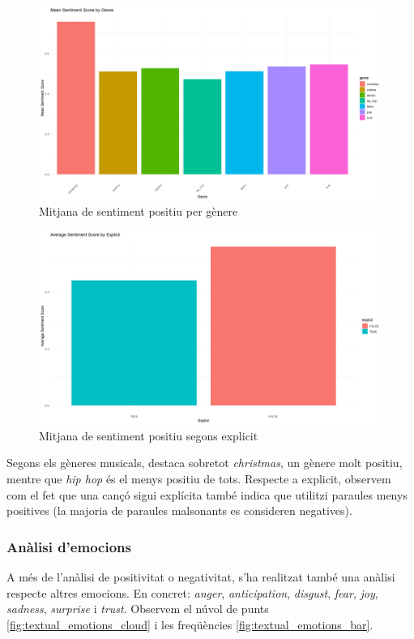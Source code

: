 \begin{figure}[H]
    \centering
    \includegraphics[width=0.7\linewidth]{Images//8_Textual//Analysis/mean_sentiment_genre.png}
    \caption{Mitjana de sentiment positiu per gènere}
    \label{fig:textual_sentiment_genre}
\end{figure}

\begin{figure}[H]
    \centering
    \includegraphics[width=0.7\linewidth]{Images//8_Textual//Analysis/mean_sentiment_explicit.png}
    \caption{Mitjana de sentiment positiu segons explicit}
    \label{fig:textual_sentiment_explicit}
\end{figure}

Segons els gèneres musicals, destaca sobretot \textit{christmas}, un gènere molt positiu, mentre que \textit{hip hop} és el menys positiu de tots. Respecte a explicit, observem com el fet que una cançó sigui explícita també indica que utilitzi paraules menys positives (la majoria de paraules malsonants es consideren negatives).

\subsubsection{Anàlisi d'emocions}
A més de l'anàlisi de positivitat o negativitat, s'ha realitzat també una anàlisi respecte altres emocions. En concret: \textit{anger}, \textit{anticipation}, \textit{disgust}, \textit{fear}, \textit{joy}, \textit{sadness}, \textit{surprise} i \textit{trust}. Observem el núvol de punts \ref{fig:textual_emotions_cloud} i les freqüències \ref{fig:textual_emotions_bar}.

